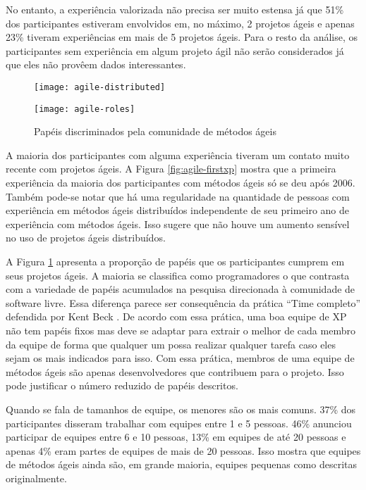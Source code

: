 No entanto, a experiência valorizada não precisa ser muito estensa já
que 51\% dos participantes estiveram envolvidos em, no máximo, 2
projetos ágeis e apenas 23\% tiveram experiências em mais de 5
projetos ágeis.  Para o resto da análise, os participantes sem
experiência em algum projeto ágil não serão considerados já que eles
não provêem dados interessantes.

\begin{figure}[thb]
  \begin{minipage}[t]{0.6\linewidth}
    \centering
    \texttt{[image: agile-distributed]}
    \caption{Ano da 1$^{\textrm{a}}$ experiência com métodos ágeis com
      experiência distribuída ou não}
    \label{fig:agile-firstxp}
  \end{minipage}
  \begin{minipage}[t]{0.4\linewidth}
    \centering
    \texttt{[image: agile-roles]}
    \caption{Papéis discriminados pela comunidade de métodos ágeis}
    \label{fig:agile-roles}
  \end{minipage}
\end{figure}

A maioria dos participantes com alguma experiência tiveram um contato
muito recente com projetos ágeis. A Figura \ref{fig:agile-firstxp}
mostra que a primeira experiência da maioria dos participantes com
métodos ágeis só se deu após 2006. Também pode-se notar que há uma
regularidade na quantidade de pessoas com experiência em métodos ágeis
distribuídos independente de seu primeiro ano de experiência com
métodos ágeis. Isso sugere que não houve um aumento sensível no uso de
projetos ágeis distribuídos.

A Figura \ref{fig:agile-roles} apresenta a proporção de papéis que os
participantes cumprem em seus projetos ágeis. A maioria se classifica
como programadores o que contrasta com a variedade de papéis
acumulados na pesquisa direcionada à comunidade de software
livre. Essa diferença parece ser consequência da prática ``Time
completo'' defendida por Kent Beck \cite{XP01}. De acordo com essa
prática, uma boa equipe de XP não tem papéis fixos mas deve se adaptar
para extrair o melhor de cada membro da equipe de forma que qualquer
um possa realizar qualquer tarefa caso eles sejam os mais indicados
para isso. Com essa prática, membros de uma equipe de métodos ágeis
são apenas desenvolvedores que contribuem para o projeto. Isso pode
justificar o número reduzido de papéis descritos.

Quando se fala de tamanhos de equipe, os menores são os mais
comuns. 37\% dos participantes disseram trabalhar com equipes entre 1
e 5 pessoas. 46\% anunciou participar de equipes entre 6 e 10 pessoas,
13\% em equipes de até 20 pessoas e apenas 4\% eram partes de equipes
de mais de 20 pessoas. Isso mostra que equipes de métodos ágeis ainda
são, em grande maioria, equipes pequenas como descritas originalmente.

